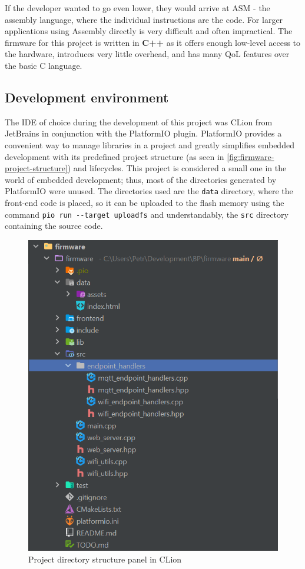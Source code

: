 \documentclass[FM,BP,EN,fonts]{tulthesis}
\begin{document}
If the developer wanted to go even lower, they would arrive at ASM - the assembly language, where the individual instructions are the code. For larger applications using Assembly directly is very difficult and often impractical. The firmware for this project is written in \textbf{C++} as it offers enough low-level access to the hardware, introduces very little overhead, and has many QoL features over the basic C language.

\subsection{Development environment}
The IDE of choice during the development of this project was CLion from JetBrains in conjunction with the PlatformIO plugin. PlatformIO provides a convenient way to manage libraries in a project and greatly simplifies embedded development with its predefined project structure (as seen in \autoref{fig:firmware-project-structure}) and lifecycles. This project is considered a small one in the world of embedded development; thus, most of the directories generated by PlatformIO were unused. The directories used are the \verb|data| directory, where the front-end code is placed, so it can be uploaded to the flash memory using the command \verb|pio run --target uploadfs| and understandably, the \verb|src| directory containing the source code.

\begin{figure}[ht]
    \centering
    \includegraphics{media/firmware-project-structure.png}
    \caption{Project directory structure panel in CLion}
    \label{fig:firmware-project-structure}
\end{figure}
\end{document}
